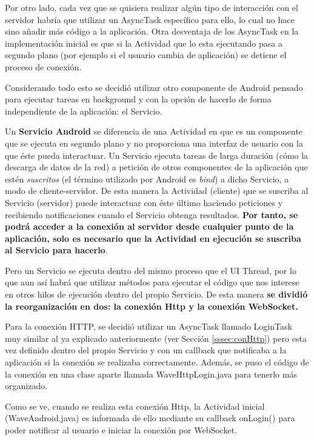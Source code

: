     Por otro lado, cada vez que se quisiera realizar algún tipo de interacción con el servidor habría que utilizar un AsyncTask específico para ello, lo cual no hace sino añadir más código a la aplicación. Otra desventaja de los AsyncTask en la implementación inicial es que si la Actividad que lo esta ejecutando pasa a segundo plano (por ejemplo si el usuario cambia de aplicación) se detiene el proceso de conexión. 

    Considerando todo esto se decidió utilizar otro componente de Android pensado para ejecutar tareas en background y con la opción de hacerlo de forma independiente de la aplicación: el Servicio\cite{ref:android_service}.

    Un \textbf{Servicio Android} se diferencia de una Actividad en que es un componente que se ejecuta en segundo plano y no proporciona una interfaz de usuario con la que éste pueda interactuar. Un Servicio ejecuta tareas de larga duración (cómo la descarga de datos de la red) a petición de otros componentes de la aplicación que estén \textit{suscritos} (el término utilizado por Android es \textit{bind}) a dicho Servicio, a modo de cliente-servidor. De esta manera la Actividad (cliente) que se suscriba al Servicio (servidor) puede interactuar con éste último haciendo peticiones y recibiendo notificaciones cuando el Servicio obtenga resultados. \textbf{Por tanto, se podrá acceder a la conexión al servidor desde cualquier punto de la aplicación, solo es necesario que la Actividad en ejecución se suscriba al Servicio para hacerlo}. 
    
    Pero un Servicio se ejecuta dentro del mismo proceso que el UI Thread, por lo que aun así habrá que utilizar métodos para ejecutar el código que nos interese en otros hilos de ejecución dentro del propio Servicio. De esta manera \textbf{se dividió la reorganización en dos: la conexión Http y la conexión WebSocket.}
    
    Para la conexión HTTP, se decidió utilizar un AsyncTask llamado LoginTask muy similar al ya explicado anteriormente (ver Sección \ref{sssec:conHttp}) pero esta vez definido dentro del propio Servicio y con un callback que notificaba a la aplicación si la conexión se realizaba correctamente. Además, se puso el código de la conexión en una clase aparte llamada WaveHttpLogin.java para tenerlo más organizado.
    
    Como se ve, cuando se realiza esta conexión Http, la Actividad inicial (WaveAndroid.java) es informada de ello mediante su callback onLogin() para poder notificar al usuario e iniciar la conexión por WebSocket. 
    
